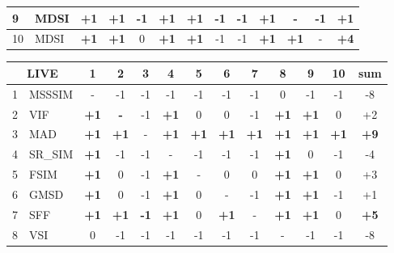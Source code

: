 \begin{table*}[htb]
{\begin{tabular}{|l|l|c|c|c|c|c|c|c|c|c|c||c|}
9         & MDSI           & \textbf{+1} & \textbf{+1} & -1          & \textbf{+1} & \textbf{+1} & -1          & -1 & \textbf{+1} & -           & -1          & +1          \\ \hline
10        & MDSI          & \textbf{+1} & \textbf{+1} & 0           & \textbf{+1} & \textbf{+1} & -1          & -1 & \textbf{+1} & \textbf{+1} & -           & \textbf{+4} \\ \hline
\end{tabular}
\newline
\vspace*{2 mm}
\newline
\begin{tabular}{|l|l|c|c|c|c|c|c|c|c|c|c||c|}
\hline
\multicolumn{2}{|c|}{LIVE} & 1           & 2           & 3           & 4           & 5           & 6           & 7           & 8           & 9           & 10          & sum         \\ \hline
1         & MSSSIM         & -           & -1          & -1          & -1          & -1          & -1          & -1          & 0           & -1          & -1          & -8          \\ \hline
2         & VIF            & \textbf{+1} & \textbf{-}  & -1          & \textbf{+1} & 0           & 0           & -1          & \textbf{+1} & \textbf{+1} & 0           & +2          \\ \hline
3         & MAD            & \textbf{+1} & \textbf{+1} & -           & \textbf{+1} & \textbf{+1} & \textbf{+1} & \textbf{+1} & \textbf{+1} & \textbf{+1} & \textbf{+1} & \textbf{+9} \\ \hline
4         & SR\_SIM        & \textbf{+1} & -1          & -1          & -           & -1          & -1          & -1          & \textbf{+1} & 0           & -1          & -4          \\ \hline
5         & FSIM          & \textbf{+1} & 0           & -1          & \textbf{+1} & -           & 0           & 0           & \textbf{+1} & \textbf{+1} & 0           & +3          \\ \hline
6         & GMSD           & \textbf{+1} & 0           & -1          & \textbf{+1} & 0           & -           & -1          & \textbf{+1} & \textbf{+1} & -1          & +1          \\ \hline
7         & SFF            & \textbf{+1} & \textbf{+1} & \textbf{-1} & \textbf{+1} & 0           & \textbf{+1} & -           & \textbf{+1} & \textbf{+1} & 0           & \textbf{+5} \\ \hline
8         & VSI            & 0           & -1          & -1          & -1          & -1          & -1          & -1          & -           & -1          & -1          & -8          \\ \hline

\end{tabular}}
\end{table*}
